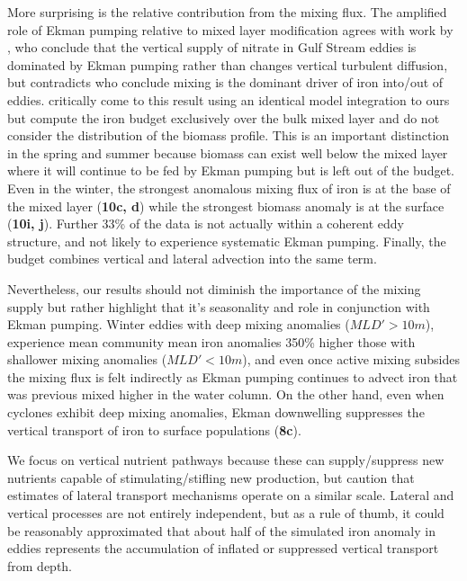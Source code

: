 \documentclass{article}
\begin{document}
More surprising is the relative contribution from the mixing flux. The amplified role of Ekman pumping relative to mixed layer modification agrees with work by \textcite{ZhangImpactsMesoscaleEddies2018}, who conclude that the vertical supply of nitrate in Gulf Stream eddies is dominated by Ekman pumping rather than changes vertical turbulent diffusion, but contradicts \textcite{SongSeasonalvariationcorrelation2018} who conclude mixing is the dominant driver of iron into/out of eddies. \textcite{SongSeasonalvariationcorrelation2018} critically come to this result using an identical model integration to ours but compute the iron budget exclusively over the bulk mixed layer and do not consider the distribution of the biomass profile. This is an important distinction in the spring and summer because biomass can exist well below the mixed layer where it will continue to be fed by Ekman pumping but is left out of the \parencite{SongSeasonalvariationcorrelation2018} budget. Even in the winter, the strongest anomalous mixing flux of iron is at the base of the mixed layer (\textbf{10c, d}) while the strongest biomass anomaly is at the surface (\textbf{10i, j}). Further 33\% of the \textcite{SongSeasonalvariationcorrelation2018} data is not actually within a coherent eddy structure, and not likely to experience systematic Ekman pumping. Finally, the \parencite{SongSeasonalvariationcorrelation2018} budget combines vertical and lateral advection into the same term. 

Nevertheless, our results should not diminish the importance of the mixing supply but rather highlight that it's seasonality and role in conjunction with Ekman pumping. Winter eddies with deep mixing anomalies ($MLD'>10m$), experience mean community mean iron anomalies 350\% higher those with shallower mixing anomalies ($MLD'<10m$), and even once active mixing subsides the mixing flux is felt indirectly as Ekman pumping continues to advect iron that was previous mixed higher in the water column. On the other hand, even when cyclones exhibit deep mixing anomalies, Ekman downwelling suppresses the vertical transport of iron to surface populations (\textbf{8c}).

We focus on vertical nutrient pathways because these can supply/suppress new nutrients capable of stimulating/stifling new production, but caution that estimates of lateral transport mechanisms operate on a similar scale. Lateral and vertical processes are not entirely independent, but as a rule of thumb, it could be reasonably approximated that about half of the simulated iron anomaly in eddies represents the accumulation of inflated or suppressed vertical transport from depth.  
\end{document}
